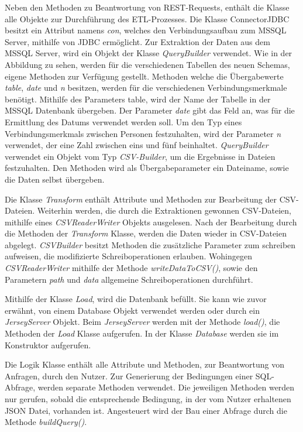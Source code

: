 Neben den Methoden zu Beantwortung von REST-Requests, enthält die Klasse alle Objekte zur Durchführung des ETL-Prozesses. Die Klasse ConnectorJDBC besitzt ein Attribut namens \textit{con}, welches den Verbindungsaufbau zum MSSQL Server, mithilfe von JDBC ermöglicht. Zur Extraktion der Daten aus dem MSSQL Server, wird ein Objekt der Klasse \textit{QueryBuilder} verwendet. Wie in der Abbildung zu sehen, werden für die verschiedenen Tabellen des neuen Schemas, eigene Methoden zur Verfügung gestellt. Methoden welche die Übergabewerte \textit{table}, \textit{date} und \textit{n} besitzen, werden für die verschiedenen Verbindungsmerkmale benötigt. Mithilfe des Parameters table, wird der Name der Tabelle in der MSSQL Datenbank übergeben. Der Parameter \textit{date} gibt das Feld an, was für die Ermittlung des Datums verwendet werden soll. Um den Typ eines Verbindungsmerkmals zwischen Personen festzuhalten, wird der Parameter \textit{n} verwendet, der eine Zahl zwischen eins und fünf beinhaltet. \textit{QueryBuilder} verwendet ein Objekt vom Typ \textit{CSV-Builder}, um die Ergebnisse in Dateien festzuhalten. Den Methoden wird als Übergabeparameter ein Dateiname, sowie die Daten selbst übergeben.

Die Klasse \textit{Transform} enthält Attribute und Methoden zur Bearbeitung der CSV-Dateien. Weiterhin werden, die durch die Extraktionen gewonnen CSV-Dateien, mithilfe eines \textit{CSVReaderWriter} Objekts ausgelesen. Nach der Bearbeitung durch die Methoden der \textit{Transform} Klasse, werden die Daten wieder in CSV-Dateien abgelegt. \textit{CSVBuilder} besitzt Methoden die zusätzliche Parameter zum schreiben aufweisen, die modifizierte Schreiboperationen erlauben. Wohingegen \textit{CSVReaderWriter} mithilfe der Methode \textit{writeDataToCSV()}, sowie den Parametern \textit{path} und \textit{data} allgemeine Schreiboperationen durchführt.

Mithilfe der Klasse \textit{Load}, wird die Datenbank befüllt. Sie kann wie zuvor erwähnt, von einem Database Objekt verwendet werden oder durch ein \textit{JerseyServer} Objekt. Beim \textit{JerseyServer} werden mit der Methode \textit{load()}, die Methoden der \textit{Load} Klasse aufgerufen. In der Klasse \textit{Database} werden sie im Konstruktor aufgerufen. 

Die Logik Klasse enthält alle Attribute und Methoden, zur Beantwortung von Anfragen, durch den Nutzer. Zur Generierung der Bedingungen einer SQL-Abfrage, werden separate Methoden verwendet. Die jeweiligen Methoden werden nur gerufen, sobald die entsprechende Bedingung, in der vom Nutzer erhaltenen JSON Datei, vorhanden ist. Angesteuert wird der Bau einer Abfrage durch die Methode \textit{buildQuery()}. 

